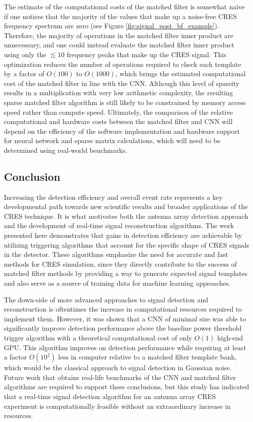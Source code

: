 The estimate of the computational costs of the matched filter is somewhat naive if one notices that the majority of the values that make up a noise-free CRES frequency spectrum are zero (see Figure \ref{fig:signal_post_bf_example}). Therefore, the majority of operations in the matched filter inner product are unnecessary, and one could instead evaluate the matched filter inner product using only the $\lesssim10$ frequency peaks that make up the CRES signal. This optimization reduces the number of operations required to check each template by a factor of $O(100)$ to $O(1000)$, which brings the estimated computational cost of the matched filter in line with the CNN. Although this level of sparsity results in a multiplication with very low arithmetic complexity, the resulting sparse matched filter algorithm is still likely to be constrained by memory access speed rather than compute speed. Ultimately, the comparison of the relative computational and hardware costs between the matched filter and CNN will depend on the efficiency of the software implementation and hardware support for neural network and sparse matrix calculations, which will need to be determined using real-world benchmarks.



\subsection{Conclusion}
\label{sec:conclusion}

Increasing the detection efficiency and overall event rate represents a key developmental path towards new scientific results and broader applications of the CRES technique. It is what motivates both the antenna array detection approach and the development of real-time signal reconstruction algorithms. The work presented here demonstrates that gains in detection efficiency are achievable by utilizing triggering algorithms that account for the specific shape of CRES signals in the detector. These algorithms emphasize the need for accurate and fast methods for CRES simulation, since they directly contribute to the success of matched filter methods by providing a way to generate expected signal templates and also serve as a source of training data for machine learning approaches. 

The down-side of more advanced approaches to signal detection and reconstruction is oftentimes the increase in computational resources required to implement them. However, it was shown that a CNN of minimal size was able to significantly improve detection performance above the baseline power threshold trigger algorithm with a theoretical computational cost of only $O(1)$ high-end GPU. This algorithm improves on detection performance while requiring at least a factor $O(10^2)$ less in computer relative to a matched filter template bank, which would be the classical approach to signal detection in Gaussian noise. Future work that obtains real-life benchmarks of the CNN and matched filter algorithms are required to support these conclusions, but this study has indicated that a real-time signal detection algorithm for an antenna array CRES experiment is computationally feasible without an extraordinary increase in resources.

